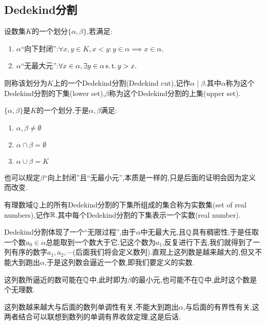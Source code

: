 \subsection{Dedekind分割}

\begin{definition}
    [Dedekind分割]
设数集$K$的一个划分$\{\alpha,\beta\}$,若满足:
    \begin{enumerate}
        \item $\alpha$“向下封闭”:$\forall x,y\in K,x<y:y\in \alpha\implies x\in \alpha.$
        \item $\alpha$“无最大元”:$\forall x\in\alpha,\exists y\in\alpha\operatorname{s.t.} y>x.$
    \end{enumerate}
    则称该划分为$K$上的一个Dedekind分割(Dedekind cut),记作$\alpha\mid\beta$.其中$\alpha$称为这个Dedekind分割的下集(lower set),$\beta$称为这个Dedekind分割的上集(upper set).
\end{definition}

\begin{remark}
    $\{\alpha,\beta\}$是$K$的一个划分,于是$\alpha,\beta$满足:
    \begin{enumerate}
        \item $\alpha,\beta\ne\emptyset$
        \item $\alpha\cap\beta =\emptyset$
        \item $\alpha\cup\beta =K$
    \end{enumerate}
\end{remark}

\begin{remark}
    也可以规定$\beta$“向上封闭”且“无最小元”,本质是一样的,只是后面的证明会因为定义而改变.
\end{remark}

\begin{definition}
    [实数集]
    有理数域$\mathbb{Q}$上的所有Dedekind分割的下集所组成的集合称为实数集(set of real numbers),记作$\mathbb{R}$.其中每个Dedekind分割的下集表示一个实数(real number).
\end{definition}

\begin{note}
    Dedekind分割体现了一个“无限过程”,由于$\alpha$中无最大元,且$\mathbb{Q}$具有稠密性,于是任取一个数$a_0\in\alpha$总能取到一个数大于它,记这个数为$a_1$,反复进行下去,我们就得到了一列有序的数字$a_1,a_2,\cdots$(后面我们将会定义数列).直观上这列数是越来越大的,但又不能大到跑出$\alpha$,于是这列数会逼近一个数,即我们要定义的实数.
\end{note}

\begin{remark}
    这列数所逼近的数可能在$\mathbb{Q}$中,此时即为$\beta$的最小元,也可能不在$\mathbb{Q}$中,此时这个数是个无理数.
\end{remark}

\begin{remark}
    这列数越来越大与后面的数列单调性有关,不能大到跑出$\alpha$,与后面的有界性有关,这两者结合可以联想到数列的单调有界收敛定理,这是后话.
\end{remark}
